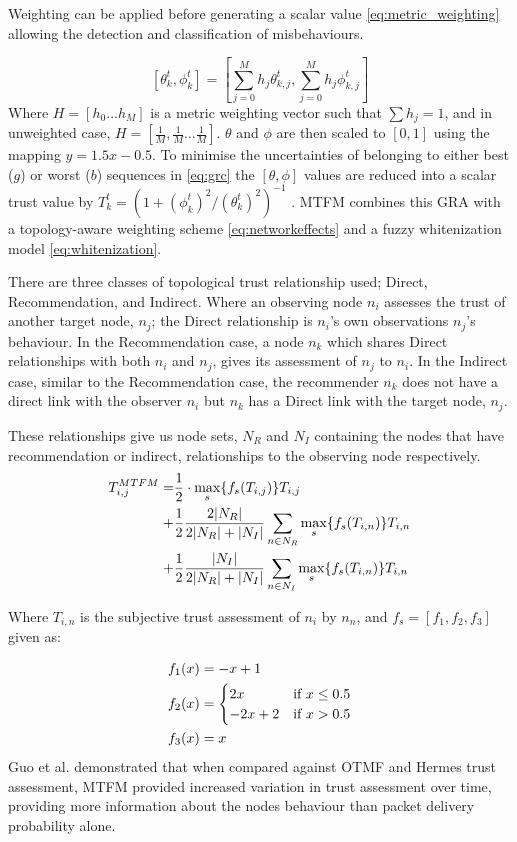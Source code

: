 \documentclass[conference]{IEEEtran}
\begin{document}
Weighting can be applied before generating a scalar value \eqref{eq:metric_weighting} allowing the detection and classification of misbehaviours.

%
\begin{equation}
  \label{eq:metric_weighting}
  [\theta_k^t, \phi_k^t] = \left[\sum_{j=0}^M h_j \theta_{k,j}^t,\sum_{j=0}^M h_j \phi_{k,j}^t \right]
\end{equation}
%
Where $H=[h_0\dots h_M]$ is a metric weighting vector such that $\sum h_j = 1$, and in unweighted case, $H=[\frac{1}{M},\frac{1}{M}\dots\frac{1}{M}]$.
$\theta$ and $\phi$ are then scaled to $[0,1]$ using the mapping $y = 1.5 x - 0.5$.
To minimise the uncertainties of belonging to either best ($g$) or worst ($b$) sequences in \eqref{eq:grc} the $[\theta,\phi]$ values are reduced into a scalar trust value by $T_k^t = ({1+{(\phi_k^t)^2}/{(\theta_k^t)^2}})^{-1}$ \cite{Hong2010}.
MTFM combines this GRA with a topology-aware weighting scheme \eqref{eq:networkeffects} and a fuzzy whitenization model \eqref{eq:whitenization}. 

There are three classes of topological trust relationship used; Direct, Recommendation, and Indirect.
Where an observing node $n_i$ assesses the trust of another target node, $n_j$; the Direct relationship is $n_i$'s own observations $n_j$'s behaviour.
In the Recommendation case, a node $n_k$ which shares Direct relationships with both $n_i$ and $n_j$, gives its assessment of $n_j$ to $n_i$.
In the Indirect case, similar to the Recommendation case, the recommender $n_k$ does not have a direct link with the observer $n_i$ but $n_k$ has a Direct link with the target node, $n_j$.

These relationships give us node sets, $N_R$ and $N_I$ containing the nodes that have recommendation or indirect, relationships to the observing node respectively.
%
\begin{align}
  \label{eq:networkeffects}
  T_{i,j}^{MTFM}=&\frac{1}{2} \cdot \max_s\{f_s(T_{i,j})\} T_{i,j}\\ \notag
  +&\frac{1}{2} \frac{2|N_R| }{2|N_R| + |N_I|}\sum_{n \in N_R} \max_s\{f_s(T_{i,n})\} T_{i,n}\\ \notag
  +&\frac{1}{2} \frac{|N_I| }{2|N_R| + |N_I|}\sum_{n \in N_I} \max_s\{f_s(T_{i,n})\} T_{i,n} 
\end{align}

Where $T_{i,n}$ is the subjective trust assessment of $n_i$ by $n_n$, and $f_s = [ f_1,f_2, f_3]$ given as:

\begin{align}
  \label{eq:whitenization}
  f_1(x)&= -x+1\notag\\
  f_2(x)&= 
  \begin{cases}
    2x & \text{if }x\leq 0.5\\
    -2x+2 & \text{if }x>0.5
  \end{cases}\\
  f_3(x)&= x\notag
\end{align}
%
Guo et al. demonstrated that when compared against OTMF and Hermes trust assessment, MTFM provided increased variation in trust assessment over time, providing more information about the nodes behaviour than packet delivery probability alone.
\end{document}
